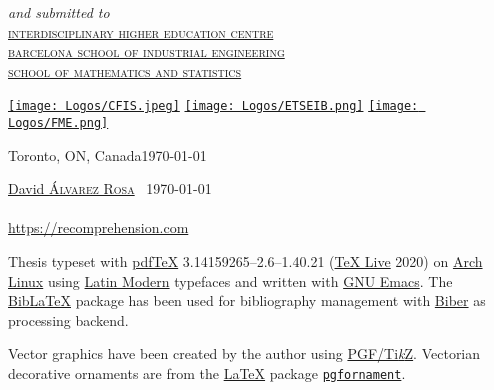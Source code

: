 \begin{center}
  \large
  \textsl{and submitted to}\Large\\[-.25ex]
  \scshape
  \href{https://cfis.upc.edu/en}{interdisciplinary higher education centre}\\[-.5ex]
  \href{https://etseib.upc.edu/en}{barcelona school of industrial engineering}\\[-.5ex]
  \href{https://fme.upc.edu/en}{school of mathematics and statistics}


  \vfill
  \href{https://cfis.upc.edu/en}{\texttt{[image: Logos/CFIS.jpeg]}}
  \hspace{1em}
  \href{https://etseib.upc.edu/en}{\texttt{[image: Logos/ETSEIB.png]}}
  \hspace{1em}
  \href{https://fme.upc.edu/en}{\texttt{[image: Logos/FME.png]}}\\[1ex]

  \vfill

  \normalsize
  Toronto, ON, Canada\hfill\today
\end{center}


\clearpage{}
\thispagestyle{empty}
\small
\null\vfill

\begin{center}
\end{center}

\vspace{1ex}
\noindent\href{https://david.alvarezrosa.com/}{David \textsc{Álvarez Rosa}}
\textcopyright\ \today\\
\makeatletter\href{https://recomprehension.com/}{\textsl{\@title}}\makeatother\\
\url{https://recomprehension.com}


\bigskip
\noindent Thesis typeset with
\href{http://tug.org/applications/pdftex/}{pdf\TeX{}} 3.14159265--2.6--1.40.21
(\href{https://www.tug.org/svn/texlive/}{\TeX{} Live} 2020) on
\href{https://archlinux.org/}{Arch Linux} using
\href{https://www.ctan.org/tex-archive/fonts/lm/}{Latin Modern} typefaces and
written with \href{https://www.gnu.org/software/emacs/}{GNU Emacs}. The
\href{https://www.ctan.org/pkg/biblatex}{Bib\LaTeX{}} package has been used for
bibliography management with
\href{http://biblatex-biber.sourceforge.net/}{Biber} as processing backend.

Vector graphics have been created by the author using
\href{https://www.ctan.org/pkg/pgf}{PGF/Ti\emph{k}Z}. Vectorian decorative
ornaments are from the \href{https://www.latex-project.org//}{\LaTeX} package
\href{https://ctan.org/pkg/pgfornament}{\texttt{pgfornament}}.


